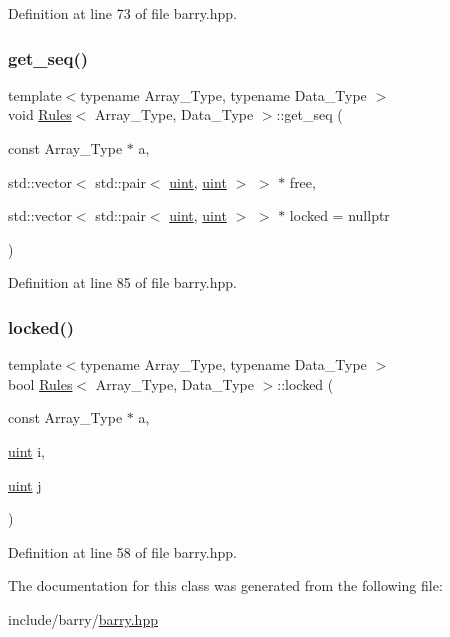 Definition at line 73 of file barry.\+hpp.

\mbox{\label{classbarry_1_1_rules_a7b8f29955ec52f49808d7ea1cd4eaf5e}} 
\subsubsection{\texorpdfstring{get\+\_\+seq()}{get\_seq()}}
{\footnotesize\ttfamily template$<$typename Array\+\_\+\+Type, typename Data\+\_\+\+Type $>$ \\
void \hyperlink{classbarry_1_1_rules}{Rules}$<$ Array\+\_\+\+Type, Data\+\_\+\+Type $>$\+::get\+\_\+seq (\begin{DoxyParamCaption}\item[{const Array\+\_\+\+Type $\ast$}]{a,  }\item[{std\+::vector$<$ std\+::pair$<$ \hyperlink{namespacebarry_a11dfc53ddb4672278319aa04f1e09a6c}{uint}, \hyperlink{namespacebarry_a11dfc53ddb4672278319aa04f1e09a6c}{uint} $>$ $>$ $\ast$}]{free,  }\item[{std\+::vector$<$ std\+::pair$<$ \hyperlink{namespacebarry_a11dfc53ddb4672278319aa04f1e09a6c}{uint}, \hyperlink{namespacebarry_a11dfc53ddb4672278319aa04f1e09a6c}{uint} $>$ $>$ $\ast$}]{locked = {\ttfamily nullptr} }\end{DoxyParamCaption})\hspace{0.3cm}{\ttfamily [inline]}}



Definition at line 85 of file barry.\+hpp.

\mbox{\label{classbarry_1_1_rules_a4e08a6b3d8b536cb1717c62192a91537}} 
\subsubsection{\texorpdfstring{locked()}{locked()}}
{\footnotesize\ttfamily template$<$typename Array\+\_\+\+Type, typename Data\+\_\+\+Type $>$ \\
bool \hyperlink{classbarry_1_1_rules}{Rules}$<$ Array\+\_\+\+Type, Data\+\_\+\+Type $>$\+::locked (\begin{DoxyParamCaption}\item[{const Array\+\_\+\+Type $\ast$}]{a,  }\item[{\hyperlink{namespacebarry_a11dfc53ddb4672278319aa04f1e09a6c}{uint}}]{i,  }\item[{\hyperlink{namespacebarry_a11dfc53ddb4672278319aa04f1e09a6c}{uint}}]{j }\end{DoxyParamCaption})\hspace{0.3cm}{\ttfamily [inline]}}



Definition at line 58 of file barry.\+hpp.



The documentation for this class was generated from the following file\+:\begin{DoxyCompactItemize}
\item 
include/barry/\hyperlink{barry_8hpp}{barry.\+hpp}\end{DoxyCompactItemize}
